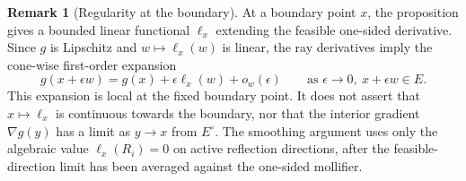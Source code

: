 \documentclass[aihp]{imsart}
\numberwithin{equation}{section}
\theoremstyle{plain}
\theoremstyle{definition}
\newtheorem{remark}[remark]{Remark}
\newcommand{\1}{\mathbf 1}
\newcommand{\norm}[1]{\left\lVert #1\right\rVert}
\newcommand{\abs}[1]{\left\lvert #1\right\rvert}
\begin{document}

\begin{remark}[Regularity at the boundary]\label{rem:no-classical-gradient} At a boundary point $x$, the proposition gives a bounded linear functional $\ell_x$ extending the feasible one-sided derivative.  Since $g$ is Lipschitz and $w\mapsto\ell_x(w)$ is linear, the ray derivatives imply the cone-wise first-order expansion
\[
 g(x+\epsilon w)=g(x)+\epsilon\ell_x(w)+o_w(\epsilon)
 \qquad
 \text{as }\epsilon\to0,\ x+\epsilon w\in E.
\]
This expansion is local at the fixed boundary point.  It does not assert that $x\mapsto\ell_x$ is continuous towards the boundary, nor that the interior gradient $\nabla g(y)$ has a limit as $y\to x$ from $E^\circ$.  The smoothing argument uses only the algebraic value $\ell_x(R_i)=0$ on active reflection directions, after the feasible-direction limit has been averaged against the one-sided mollifier.
\end{remark}
\end{document}
